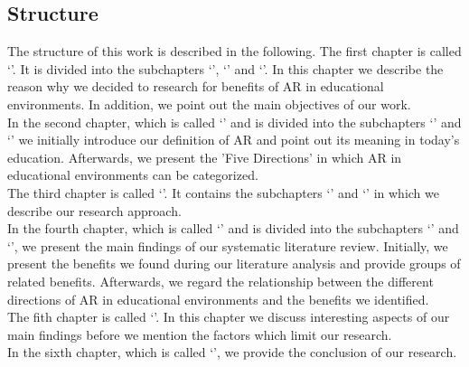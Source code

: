 \subsection{Structure}
\label{subsec:Structure}
The structure of this work is described in the following. The first chapter is called ‘’. It is divided into the subchapters ‘’, ‘’ and ‘’. In this chapter we describe the reason why we decided to research for benefits of AR in educational environments. In addition, we point out the main objectives of our work.\\
In the second chapter, which is called ‘’ and is divided into the subchapters ‘’ and ‘’ we initially introduce our definition of AR and point out its meaning in today's education. Afterwards, we present the 'Five Directions' \autocite [cf.][126-130]{Yuen.2011} in which AR in educational environments can be categorized.\\
The third chapter is called ‘’. It contains the subchapters ‘’ and ‘’ in which we describe our research approach.\\
In the fourth chapter, which is called ‘’ and is divided into the subchapters ‘’ and ‘’, we present the main findings of our systematic literature review. Initially, we present the benefits we found during our literature analysis and provide groups of related benefits. Afterwards, we regard the relationship between the different directions of AR in educational environments and the benefits we identified.\\
The fith chapter is called ‘’. In this chapter we discuss interesting aspects of our main findings before we mention the factors which limit our research.\\
In the sixth chapter, which is called ‘’, we provide the conclusion of our research.